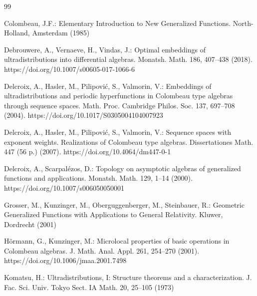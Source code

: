 \documentclass[sn-mathphys,Numbered]{sn-jnl}%
\theoremstyle{thmstyleone}%
\theoremstyle{thmstyletwo}%
\theoremstyle{thmstylethree}%
\begin{document}
\begin{thebibliography}{99}

Colombeau,  J.F.:
Elementary Introduction to New Generalized Functions.
North-Holland,  Amsterdam (1985)

Debrouwere,  A., Vernaeve,  H., Vindas, J.:
Optimal embeddings of ultradistributions into differential algebras.
Monatsh.  Math.  186, 407--438 (2018).  
https://doi.org/10.1007/s00605-017-1066-6


Delcroix, A., Hasler,  M.,  Pilipovi\'c, S.,  Valmorin,  V.:
Embeddings of ultradistributions and periodic hyperfunctions in Colombeau type algebras through sequence spaces.
Math. Proc. Cambridge Philos. Soc. 137, 697--708  (2004).  
https://doi.org/10.1017/S0305004104007923

Delcroix,  A., Hasler,  M.,  Pilipovi\'c, S., Valmorin,  V.:
Sequence spaces with exponent weights. Realizations of Colombeau type algebras. Dissertationes Math.  447 (56 p.) (2007).
https://doi.org/10.4064/dm447-0-1



Delcroix, A.,  Scarpal\'ezos, D.:
Topology on asymptotic algebras of generalized functions and applications.
Monatsh. Math. 129,  1--14 (2000).
https://doi.org/10.1007/s006050050001

Grosser,  M.,  Kunzinger, M., Oberguggenberger,  M.,  Steinbauer, R.:
Geometric Generalized Functions with Applications to General Relativity.
Kluwer,  Dordrecht (2001)

H\"ormann, G.,  Kunzinger,  M.:
Microlocal properties of basic operations in Colombeau algebras.
J. Math. Anal. Appl. 261,  254--270 (2001).
https://doi.org/10.1006/jmaa.2001.7498

Komatsu,  H.:
Ultradistributions, I: Structure theorems and a characterization.
J. Fac. Sci. Univ. Tokyo Sect. IA Math. 20,  25--105  (1973)


\end{thebibliography}
\end{document}
